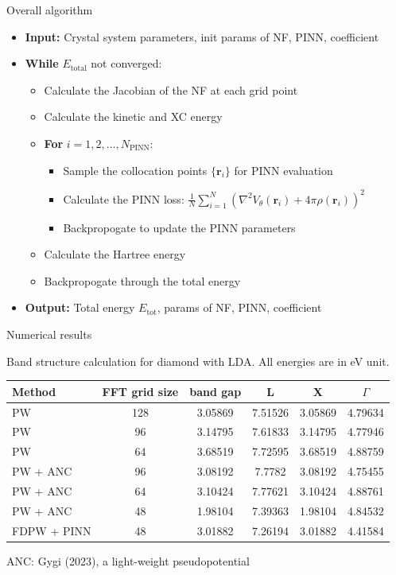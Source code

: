 \documentclass[aspectratio=169]{beamer}
\begin{document}
\begin{frame}{Overall algorithm}
	\begin{itemize}
		\item \textbf{Input:} Crystal system parameters, init params of NF, PINN, coefficient
		\item \textbf{While} $E_{\text{total}}$ not converged:
		\begin{itemize}
			\item Calculate the Jacobian of the NF at each grid point
			\item Calculate the kinetic and XC energy
			\item \textbf{For} $i = 1, 2, \ldots, N_{\text{PINN}}$:
			\begin{itemize}
				\item Sample the collocation points $\{\mathbf{r}_i\}$ for PINN evaluation
				\item Calculate the PINN loss: $\frac{1}{N}\sum_{i=1}^N (\nabla^2 V_{\theta}(\mathbf{r}_i)
				+ 4\pi \rho(\mathbf{r}_i))^2$
				\item Backpropogate to update the PINN parameters
			\end{itemize}
			\item Calculate the Hartree energy 
			\item Backpropogate through the total energy
		\end{itemize}
		\item \textbf{Output:} Total energy $E_{\text{tot}}$, params of NF, PINN, coefficient
	\end{itemize}
\end{frame}


\begin{frame}{Numerical results}
	\begin{center}
	\footnotesize
	Band structure calculation for diamond with LDA. All energies are in eV unit.
	\vspace{0.3cm}
	\begin{tabular}{l|ccccc}
	\hline
	Method & FFT grid size & band gap & L & X & $\Gamma$  \\ \hline\hline
	PW & 128 & {\color{red} 3.05869} & {\color{red} 7.51526} & {\color{red} 3.05869} & {\color{red} 4.79634}  \\ 
	PW & 96  & 3.14795 & 7.61833 & 3.14795 & 4.77946  \\ 
	PW & 64  & 3.68519 & 7.72595 & 3.68519 & 4.88759  \\ \hline
	PW + ANC & 96 & 3.08192 & 7.7782  & 3.08192 & 4.75455  \\ 
	PW + ANC & 64 & 3.10424 & 7.77621 & 3.10424 & 4.88761  \\ 
	PW + ANC & 48 & 1.98104 & 7.39363 & 1.98104 & 4.84532  \\ \hline
	FDPW + PINN & 48 & {\color{red} 3.01882} & 7.26194 & {\color{red} 3.01882} & 4.41584  \\ \hline
	\end{tabular}
	\end{center}

	ANC: Gygi (2023), a light-weight pseudopotential
\end{frame}
\end{document}
